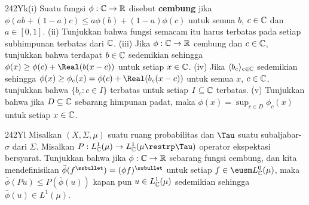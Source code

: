 {\spheader 242Yk(i) Suatu fungsi $\phi:\Bbb C\to\Bbb R$ disebut
{\bf cembung} jika
$\phi(ab+(1-a)c)\le a\phi(b)+(1-a)\phi(c)$ untuk semua $b$,
$c\in\Bbb C$ dan $a\in [0,1]$. (ii) Tunjukkan bahwa fungsi semacam itu
harus terbatas pada setiap subhimpunan terbatas dari $\Bbb C$. (iii) Jika
$\phi:\Bbb C\to\Bbb R$ cembung dan $c\in\Bbb C$, tunjukkan bahwa
terdapat $b\in\Bbb C$ sedemikian sehingga
$\phi(x)\ge\phi(c)+\Real(b(x-c))$ untuk setiap $x\in\Bbb C$. (iv) Jika
$\langle b_c\rangle_{c\in\Bbb C}$ sedemikian sehingga
$\phi(x)\ge\phi_c(x)=\phi(c)+\Real(b_c(x-c))$ untuk semua
$x$, $c\in\Bbb C$, tunjukkan bahwa $\{b_c:c\in I\}$ terbatas untuk
setiap $I\subseteq\Bbb C$ terbatas. (v) Tunjukkan bahwa jika
$D\subseteq\Bbb C$ sebarang himpunan padat, maka
$\phi(x)=\sup_{c\in D}\phi_c(x)$ untuk setiap $x\in\Bbb C$.

\spheader 242Yl Misalkan $(X,\Sigma,\mu)$ suatu ruang probabilitas dan
$\Tau$ suatu subaljabar-$\sigma$ dari $\Sigma$. Misalkan
$P:L^1_{\Bbb C}(\mu)\to L^1_{\Bbb C}(\mu\restrp\Tau)$ operator
ekspektasi bersyarat. Tunjukkan bahwa jika
$\phi:\Bbb C\to\Bbb R$ sebarang fungsi cembung, dan kita mendefinisikan
$\bar\phi(f^{\ssbullet})=(\phi f)^{\ssbullet}$ untuk setiap
$f\in\eusm L^0_{\Bbb C}(\mu)$, maka
$\bar\phi(Pu)\le P(\bar\phi(u))$ kapan pun
$u\in L^1_{\Bbb C}(\mu)$ sedemikian sehingga
$\bar\phi(u)\in L^1(\mu)$.
}%

